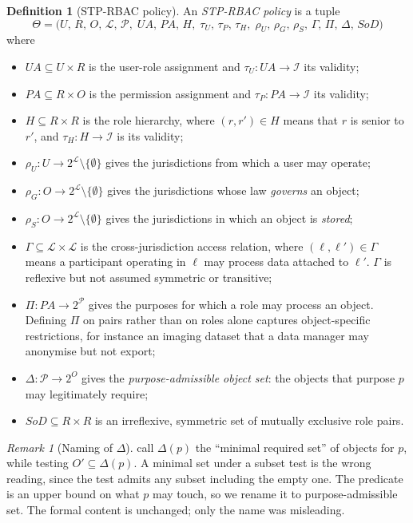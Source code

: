 \documentclass[11pt]{article}
\theoremstyle{definition}
\newtheorem{definition}{Definition}
\theoremstyle{plain}
\theoremstyle{remark}
\newtheorem{remark}{Remark}
\newcommand{\SoD}{\mathit{SoD}}
\newcommand{\Ldom}{\mathcal{L}}
\newcommand{\Pdom}{\mathcal{P}}
\begin{document}
\begin{definition}[STP-RBAC policy]
\label{def:policy}
An \emph{STP-RBAC policy} is a tuple
\[
  \Theta = \bigl(
    U,\, R,\, O,\, \Ldom,\, \Pdom,\;
    UA,\, PA,\, H,\;
    \tau_U,\, \tau_P,\, \tau_H,\;
    \rho_U,\, \rho_G,\, \rho_S,\, \Gamma,\, \Pi,\, \Delta,\, \SoD
  \bigr)
\]
where
\begin{itemize}
  \item $UA \subseteq U \times R$ is the user-role assignment and
        $\tau_U : UA \to \mathcal{I}$ its validity;
  \item $PA \subseteq R \times O$ is the permission assignment and
        $\tau_P : PA \to \mathcal{I}$ its validity;
  \item $H \subseteq R \times R$ is the role hierarchy, where $(r,r') \in H$
        means that $r$ is senior to $r'$, and $\tau_H : H \to \mathcal{I}$ is
        its validity;
  \item $\rho_U : U \to 2^{\Ldom} \setminus \{\emptyset\}$ gives the
        jurisdictions from which a user may operate;
  \item $\rho_G : O \to 2^{\Ldom} \setminus \{\emptyset\}$ gives the
        jurisdictions whose law \emph{governs} an object;
  \item $\rho_S : O \to 2^{\Ldom} \setminus \{\emptyset\}$ gives the
        jurisdictions in which an object is \emph{stored};
  \item $\Gamma \subseteq \Ldom \times \Ldom$ is the cross-jurisdiction access
        relation, where $(\ell, \ell') \in \Gamma$ means a participant
        operating in $\ell$ may process data attached to $\ell'$. $\Gamma$ is
        reflexive but not assumed symmetric or transitive;
  \item $\Pi : PA \to 2^{\Pdom}$ gives the purposes for which a role may
        process an object. Defining $\Pi$ on pairs rather than on roles alone
        captures object-specific restrictions, for instance an imaging dataset
        that a data manager may anonymise but not export;
  \item $\Delta : \Pdom \to 2^{O}$ gives the \emph{purpose-admissible object
        set}: the objects that purpose $p$ may legitimately require;
  \item $\SoD \subseteq R \times R$ is an irreflexive, symmetric set of
        mutually exclusive role pairs.
\end{itemize}
\end{definition}

\begin{remark}[Naming of $\Delta$]
\citet{kokash2026compliance} call $\Delta(p)$ the ``minimal required set'' of
objects for $p$, while testing $O' \subseteq \Delta(p)$. A minimal set under
a subset test is the wrong reading, since the test admits any subset including
the empty one. The predicate is an upper bound on what $p$ may touch, so we
rename it to purpose-admissible set. The formal content is unchanged; only the
name was misleading.
\end{remark}
\end{document}
